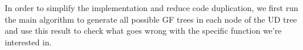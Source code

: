 In order to simplify the implementation and reduce code duplication, we first run the main algorithm to generate all possible GF trees in each node of the UD tree and use this result to check what goes wrong with the specific function we're interested in.



